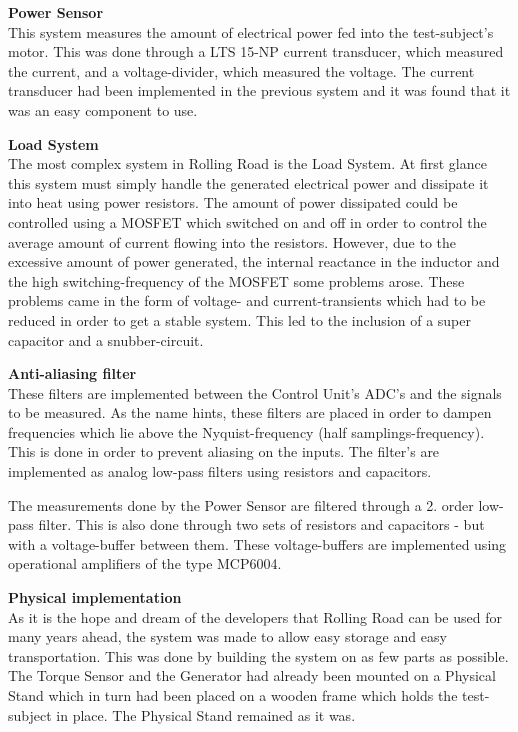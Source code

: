 \textbf{Power Sensor}\\
This system measures the amount of electrical power fed into the test-subject's motor. This was done through a LTS 15-NP current transducer\cite{CurrentTransducer}, which measured the current, and a voltage-divider, which measured the voltage. The current transducer had been implemented in the previous system and it was found that it was an easy component to use.

\textbf{Load System}\\ 
The most complex system in Rolling Road is the Load System. At first glance this system must simply handle the generated electrical power and dissipate it into heat using power resistors\cite{PowerResistor}. The amount of power dissipated could be controlled using a MOSFET\cite{IRFP260N} which switched on and off in order to control the average amount of current flowing into the resistors. However, due to the excessive amount of power generated, the internal reactance in the inductor and the high switching-frequency of the MOSFET some problems arose. These problems came in the form of voltage- and current-transients which had to be reduced in order to get a stable system. This led to the inclusion of a super capacitor\cite{SuperCapacitor} and a snubber-circuit\cite{Snubber}.

\textbf{Anti-aliasing filter}\\
These filters are implemented between the Control Unit's ADC's and the signals to be measured. As the name hints, these filters are placed in order to dampen frequencies which lie above the Nyquist-frequency (half samplings-frequency). This is done in order to prevent aliasing on the inputs. The filter's are implemented as analog low-pass filters using resistors and capacitors. 

The measurements done by the Power Sensor are filtered through a 2. order low-pass filter. This is also done through two sets of resistors and capacitors - but with a voltage-buffer between them. These voltage-buffers are implemented using operational amplifiers of the type MCP6004\cite{MCP6004}.

\textbf{Physical implementation}\\
As it is the hope and dream of the developers that Rolling Road can be used for many years ahead, the system was made to allow easy storage and easy transportation. This was done by building the system on as few parts as possible. The Torque Sensor and the Generator had already been mounted on a Physical Stand which in turn had been placed on a wooden frame which holds the test-subject in place. The Physical Stand remained as it was.


